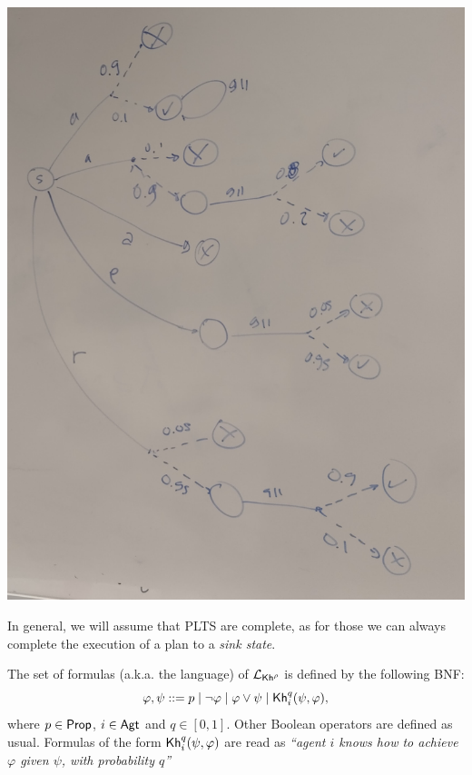 \begin{center}
\includegraphics[scale=0.1]{PLTS.jpg}
\end{center}

In general, we will assume that PLTS are complete, as for those we can always complete the execution of a plan to a \emph{sink state}.

\begin{definition}
    \label{def:syntax}
    The set of formulas (a.k.a. the language) of $\mathcal{L}_{{\mathsf{Kh}}^\rho}$ is defined by the following BNF:
    \[
        \varphi, \psi ::= p \mid \neg \varphi \mid \varphi \vee \psi \mid {\mathsf{Kh}}_i^q(\psi,\varphi),
    \]
    where $p\in{\rm \sf Prop}$, $i\in{\rm \sf Agt}$ and $q\in[0,1]$. Other Boolean operators are defined as usual. Formulas of the form ${\mathsf{Kh}}_i^q(\psi,\varphi)$ are read as \emph{``agent $i$ knows how to achieve $\varphi$ given $\psi$, with probability $q$''}
\end{definition}

